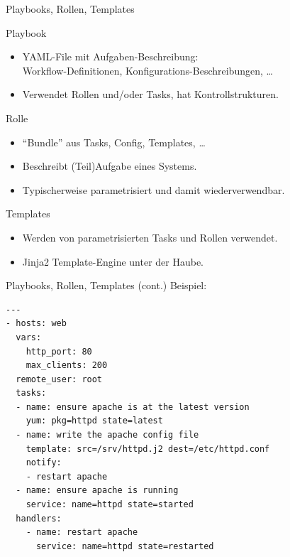 \begin{frame}{Playbooks, Rollen, Templates}
  \begin{block}{Playbook\footnotemark}
    \begin{itemize}
      \item YAML-File mit Aufgaben-Beschreibung:\\
      Workflow-Definitionen, Konfigurations-Beschreibungen, \dots
      \item Verwendet Rollen und/oder Tasks, hat Kontrollstrukturen.
    \end{itemize}
  \end{block}

  \begin{block}{Rolle}
    \begin{itemize}
      \item "`Bundle"' aus Tasks, Config, Templates, \dots
      \item Beschreibt (Teil)Aufgabe eines Systems.
      \item Typischerweise parametrisiert und damit wiederverwendbar.
    \end{itemize}
  \end{block}

  \begin{block}{Templates}
    \begin{itemize}
      \item Werden von parametrisierten Tasks und Rollen verwendet.
      \item Jinja2 Template-Engine unter der
      Haube.\footnotemark
    \end{itemize}
  \end{block}
\end{frame}


\begin{frame}[fragile]{Playbooks, Rollen, Templates (cont.)}
  Beispiel:
  \vspace{1ex}
  \begin{lstlisting}
---
- hosts: web
  vars:
    http_port: 80
    max_clients: 200
  remote_user: root
  tasks:
  - name: ensure apache is at the latest version
    yum: pkg=httpd state=latest
  - name: write the apache config file
    template: src=/srv/httpd.j2 dest=/etc/httpd.conf
    notify:
    - restart apache
  - name: ensure apache is running
    service: name=httpd state=started
  handlers:
    - name: restart apache
      service: name=httpd state=restarted
  \end{lstlisting}
\end{frame}


